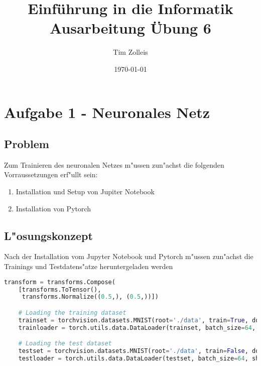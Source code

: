 \documentclass[a4paper,11pt,titlepage]{article}
\begin{document}
    \title{Einf\"uhrung in die Informatik\\
    Ausarbeitung \"Ubung 6}


    \author{Tim Zolleis}

    \date{\today}

    \maketitle{\thispagestyle{plain}}


    \section{Aufgabe 1 - Neuronales Netz}

    \subsection{Problem}
    Zum Trainieren des neuronalen Netzes m"ussen zun"achst die folgenden Vorraussetzungen erf"ullt sein:
    \begin{enumerate}
        \item Installation und Setup von Jupiter Notebook
        \item Installation von Pytorch
    \end{enumerate}

    \subsection{L"osungskonzept}
    Nach der Installation vom Jupyter Notebook und Pytorch m"ussen zun"achst die Trainings und Testdatens"atze heruntergeladen werden
    \begin{lstlisting}[language=Python]
        transform = transforms.Compose(
    [transforms.ToTensor(),
     transforms.Normalize((0.5,), (0.5,))])

    # Loading the training dataset
    trainset = torchvision.datasets.MNIST(root='./data', train=True, download=True, transform=transform)
    trainloader = torch.utils.data.DataLoader(trainset, batch_size=64, shuffle=True)

    # Loading the test dataset
    testset = torchvision.datasets.MNIST(root='./data', train=False, download=True, transform=transform)
    testloader = torch.utils.data.DataLoader(testset, batch_size=64, shuffle=False)
    \end{lstlisting}
\end{document}
